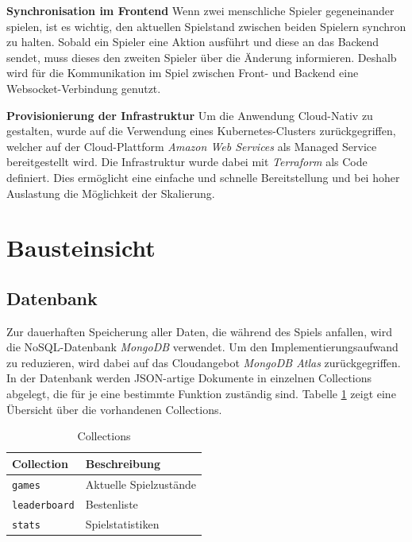 \documentclass[a4paper, 10pt, conference]{IEEEtran}
\begin{document}
\textbf{Synchronisation im Frontend}
Wenn zwei menschliche Spieler gegeneinander spielen, ist es wichtig, den aktuellen Spielstand zwischen beiden Spielern synchron zu halten. Sobald ein Spieler eine Aktion ausführt und diese an das Backend sendet, muss dieses den zweiten Spieler über die Änderung informieren. Deshalb wird für die Kommunikation im Spiel zwischen Front- und Backend eine Websocket-Verbindung genutzt.

\textbf{Provisionierung der Infrastruktur} 
Um die Anwendung Cloud-Nativ zu gestalten, wurde auf die Verwendung eines Kubernetes-Clusters zurückgegriffen, welcher auf der Cloud-Plattform \textit{Amazon Web Services} als Managed Service bereitgestellt wird. Die Infrastruktur wurde dabei mit \textit{Terraform} als Code definiert. Dies ermöglicht eine einfache und schnelle Bereitstellung und bei hoher Auslastung die Möglichkeit der Skalierung.\\

\section{Bausteinsicht}\label{sec:bausteinsicht}



\subsection{Datenbank}\label{subsec:datenbank}
Zur dauerhaften Speicherung aller Daten, die während des Spiels anfallen, wird die NoSQL-Datenbank \textit{MongoDB} \cite{mongodb} verwendet. Um den Implementierungsaufwand zu reduzieren, wird dabei auf das Cloudangebot \textit{MongoDB Atlas} \cite{mongodb-atlas} zurückgegriffen. In der Datenbank werden JSON-artige Dokumente in einzelnen Collections abgelegt, die für je eine bestimmte Funktion zuständig sind. Tabelle \ref{tab:collections} zeigt eine Übersicht über die vorhandenen Collections.

\begin{table}[h!]
    \begin{center}
        \caption{Collections}
        \label{tab:collections}
        \begin{tabular}{|l|l|}
            \textbf{Collection} & \textbf{Beschreibung}\\
            \hline
            \texttt{games}				& Aktuelle Spielzustände\\
            \texttt{leaderboard}					& Bestenliste\\
            \texttt{stats}	& Spielstatistiken\\
        \end{tabular}
    \end{center}
\end{table}
\end{document}
